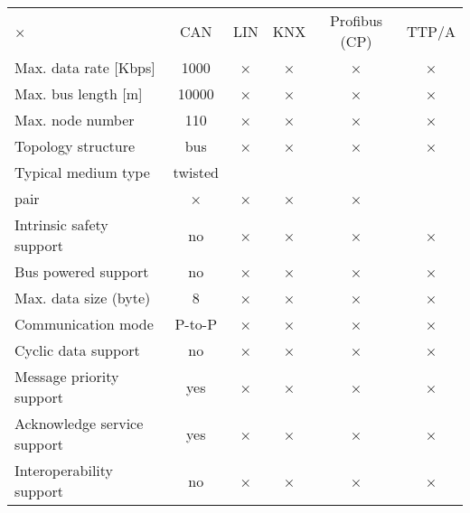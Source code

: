 
\begin{center}
\begin{tabular}{lccccc}
× & CAN & LIN & KNX & Profibus (CP) & TTP/A\\
Max. data rate [Kbps] & 1000 & × & × & × & ×\\
Max. bus length [m] & 10000 & × & × & × & ×\\
Max. node number & 110 & × & × & × & ×\\
Topology structure & bus & × & × & × & ×\\
Typical medium type & twisted\\pair & × & × & × & ×\\
Intrinsic safety support & no & × & × & × & ×\\
Bus powered support & no & × & × & × & ×\\
Max. data size (byte) & 8 & × & × & × & ×\\
Communication mode & P-to-P & × & × & × & ×\\
Cyclic data support & no & × & × & × & ×\\
Message priority support & yes & × & × & × & ×\\
Acknowledge service support & yes & × & × & × & ×\\
Interoperability support & no & × & × & × & ×
\end{tabular}
\end{center}
